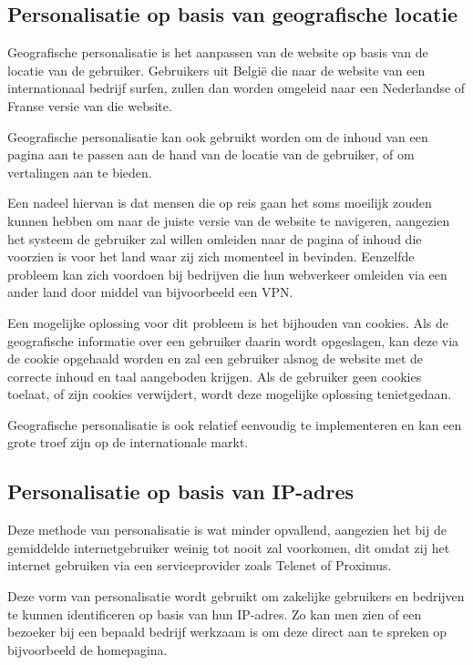 \subsection{Personalisatie op basis van geografische locatie}
\label{subsec:Personalisatie op basis van geografische locatie}

Geografische personalisatie is het aanpassen van de website op basis van de locatie van de gebruiker. Gebruikers uit België die naar de website van een internationaal bedrijf surfen, zullen dan worden omgeleid naar een Nederlandse of Franse versie van die website.

Geografische personalisatie kan ook gebruikt worden om de inhoud van een pagina aan te passen aan de hand van de locatie van de gebruiker, of om vertalingen aan te bieden.

Een nadeel hiervan is dat mensen die op reis gaan het soms moeilijk zouden kunnen hebben om naar de juiste versie van de website te navigeren, aangezien het systeem de gebruiker zal willen omleiden naar de pagina of inhoud die voorzien is voor het land waar zij zich momenteel in bevinden. Eenzelfde probleem kan zich voordoen bij bedrijven die hun webverkeer omleiden via een ander land door middel van bijvoorbeeld een VPN. 

Een mogelijke oplossing voor dit probleem is het bijhouden van cookies. Als de geografische informatie over een gebruiker daarin wordt opgeslagen, kan deze via de cookie opgehaald worden en zal een gebruiker alsnog de website met de correcte inhoud en taal aangeboden krijgen. Als de gebruiker geen cookies toelaat, of zijn cookies verwijdert, wordt deze mogelijke oplossing tenietgedaan.

Geografische personalisatie is ook relatief eenvoudig te implementeren en kan een grote troef zijn op de internationale markt. 

\subsection{Personalisatie op basis van IP-adres}
\label{subsec:Personalisatie op basis van IP-adres}

Deze methode van personalisatie is wat minder opvallend, aangezien het bij de gemiddelde internetgebruiker weinig tot nooit zal voorkomen, dit omdat zij het internet gebruiken via een serviceprovider zoals Telenet of Proximus. 

Deze vorm van personalisatie wordt gebruikt om zakelijke gebruikers en bedrijven te kunnen identificeren op basis van hun IP-adres. Zo kan men zien of een bezoeker bij een bepaald bedrijf werkzaam is om deze direct aan te spreken op bijvoorbeeld de homepagina.

